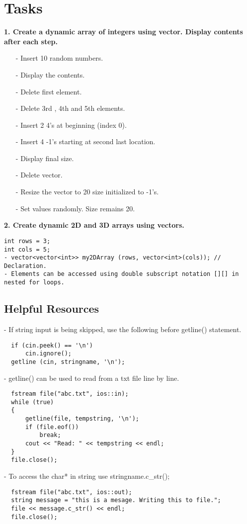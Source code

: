 \documentclass[12pt,a4paper]{article}
\begin{document}
\section{Tasks}
\textbf{1. Create a dynamic array of integers using vector. Display contents after each step.}
\begin{itemize}
\item[-] Insert 10 random numbers.
\item[-] Display the contents.
\item[-] Delete first element.
\item[-] Delete 3rd , 4th and 5th elements.
\item[-] Insert 2 4's at beginning (index 0).
\item[-] Insert 4 -1's starting at second last location.
\item[-] Display final size.
\item[-] Delete vector.
\item[-] Resize the vector to 20 size initialized to -1's.
\item[-] Set values randomly. Size remains 20.
\end{itemize}
\textbf{2. Create dynamic 2D and 3D arrays using vectors.}
\begin{verbatim}
int rows = 3;
int cols = 5;
- vector<vector<int>> my2DArray (rows, vector<int>(cols)); // Declaration.
- Elements can be accessed using double subscript notation [][] in nested for loops.
\end{verbatim}
\subsection{Helpful Resources}
- If string input is being skipped, use the following before getline() statement.
\begin{verbatim}
  if (cin.peek() == '\n')
      cin.ignore();
  getline (cin, stringname, '\n');
\end{verbatim}
- getline() can be used to read from a txt file line by line.
\begin{verbatim}
  fstream file("abc.txt", ios::in);
  while (true)
  {
      getline(file, tempstring, '\n');
      if (file.eof())
          break;
      cout << "Read: " << tempstring << endl;
  }
  file.close();
\end{verbatim}
- To access the char* in string use stringname.c\_str();
\begin{verbatim}
  fstream file("abc.txt", ios::out);
  string message = "this is a mesage. Writing this to file.";
  file << message.c_str() << endl;
  file.close();
\end{verbatim}


\end{document}
